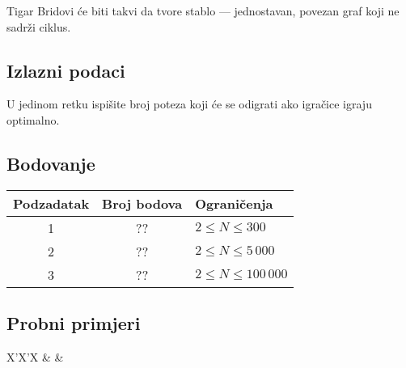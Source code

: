 \begin{statement}[
  problempoints=100,
  timelimit=3 sekunde,
  memorylimit=512 MiB,
]{Tigar}
Bridovi će biti takvi da tvore stablo --- jednostavan, povezan graf koji ne
sadrži ciklus.

\subsection*{Izlazni podaci}

U jedinom retku ispišite broj poteza koji će se odigrati ako igračice igraju
optimalno.

\subsection*{Bodovanje}

{\renewcommand{\arraystretch}{1.4}
  \setlength{\tabcolsep}{6pt}
  \begin{tabular}{ccl}
   Podzadatak & Broj bodova & Ograničenja \\ \midrule
    1 & ?? & $2 \le N \le 300$ \\
    2 & ?? & $2 \le N \le 5\,000$ \\
    3 & ?? & $2 \le N \le 100\,000$
\end{tabular}}

\subsection*{Probni primjeri}
\begin{tabularx}{\textwidth}{X'X'X}
 &
 &
\end{tabularx}

\end{statement}

